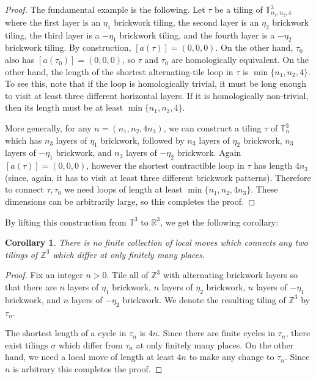 \documentclass[11pt]{article}
\newtheorem{cor}[thm]{Corollary}
\theoremstyle{remark}
\theoremstyle{definition}
\newcommand{\m}[1]{\mathbb{#1}}
\begin{document}
\begin{proof}
    The fundamental example is the following. Let $\tau$ be a tiling of $\mathbb T_{n_1,n_2,4}^3$ where the first layer is an $\eta_1$ brickwork tiling, the second layer is an $\eta_2$ brickwork tiling, the third layer is a $-\eta_1$ brickwork tiling, and the fourth layer is a $-\eta_2$ brickwork tiling. By construction, $[ a(\tau)] = (0,0,0)$. On the other hand, $\tau_0$ also has $[{a}(\tau_0)] = (0,0,0)$, so $\tau$ and $\tau_0$ are homologically equivalent. On the other hand, the length of the shortest alternating-tile loop in $\tau$ is $\min\{n_1,n_2,4\}$. To see this, note that if the loop is homologically trivial, it must be long enough to visit at least three different horizontal layers. If it is homologically non-trivial, then its length must be at least $\min\{n_1,n_2,4\}$. 

More generally, for any $ n = (n_1,n_2,4 n_3)$, we can construct a tiling $\tau$ of $\mathbb T_{ n}^3$ which has $n_3$ layers of $\eta_1$ brickwork, followed by $n_3$ layers of $\eta_2$ brickwork, $n_3$ layers of $-\eta_1$ brickwork, and $n_3$ layers of $-\eta_2$ brickwork. Again $[ a(\tau)] = (0,0,0)$, however the shortest contractible loop in $\tau$ has length $4n_3$ (since, again, it has to visit at least three different brickwork patterns). Therefore to connect $\tau,\tau_0$ we need loops of length at least $\min\{n_1,n_2,4n_3\}$. These dimensions can be arbitrarily large, so this completes the proof.
    \end{proof}

By lifting this construction from $\m T^3$ to $\m R^3$, we get the following corollary: 
\begin{cor}
There is no finite collection of local moves which connects any two tilings of $\m Z^3$ which differ at only finitely many places. 
\end{cor}

\begin{proof}
    Fix an integer $n>0$. Tile all of $\m Z^3$ with alternating brickwork layers so that there are $n$ layers of $\eta_1$ brickwork, $n$ layers of $\eta_2$ brickwork, $n$ layers of $-\eta_1$ brickwork, and $n$ layers of $-\eta_2$ brickwork. We denote the resulting tiling of $\m Z^3$ by $\tau_n$. 
    
    The shortest length of a cycle in $\tau_n$ is $4n$. Since there are finite cycles in $\tau_n$, there exist tilings $\sigma$ which differ from $\tau_n$ at only finitely many places. On the other hand, we need a local move of length at least $4n$ to make any change to $\tau_n$. Since $n$ is arbitrary this completes the proof.
\end{proof}
\end{document}
